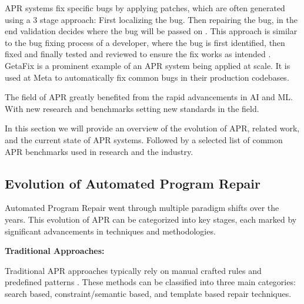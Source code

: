 APR systems fix specific bugs by applying patches, which are often generated using a 3 stage approach: First localizing the bug. Then repairing the bug, in the end validation decides where the bug will be passed on \cite{zhangSurveyLearningbasedAutomated2024, baderGetafixLearningFix2019}. This approach is similar to the bug fixing process of a developer, where the bug is first identified, then fixed and finally tested and reviewed to ensure the fix works as intended \cite{yangSWEagentAgentComputerInterfaces2024}. GetaFix \cite{baderGetafixLearningFix2019} is a prominent example of an APR system being applied at scale. It is used at Meta to automatically fix common bugs in their production codebases.

The field of APR greatly benefited from the rapid advancements in AI and ML. With new research and benchmarks setting new standards in the field.\cite{puvvadiCodingAgentsComprehensive2025,houLargeLanguageModels2024}

In this section we will provide an overview of the evolution of APR, related work, and the current state of APR systems. Followed by a selected list of common APR benchmarks used in research and the industry.

\subsection{Evolution of Automated Program Repair} \label{subsection:evolution-apr}

Automated Program Repair went through multiple paradigm shifts over the years. This evolution of APR can be categorized into key stages, each marked by significant advancements in techniques and methodologies.

\textbf{Traditional Approaches:}

Traditional APR approaches typically rely on manual crafted rules and predefined patterns \cite{liuMarsCodeAgentAInative2024, xiaAutomatedProgramRepair2023,yinThinkRepairSelfDirectedAutomated2024}. These methods can be classified into three main categories: search based, constraint/semantic based, and template based repair techniques.

